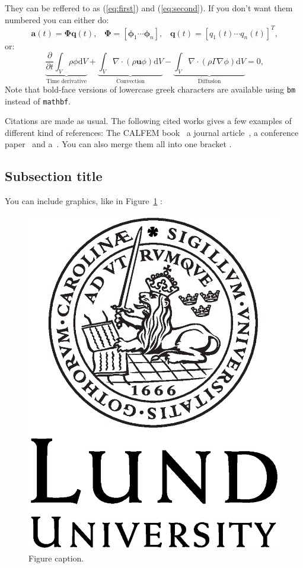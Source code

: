 They can be reffered to as (\ref{eq:first}) and (\ref{eq:second}). If you don't want them numbered you can either do:
\begin{equation*}
  \mathbf{a}(t) = \bm{\Phi}\mathbf{q}(t) \text{,} \quad
  \bm{\Phi} = \left[ \bm{\phi}_1 \dotsb \bm{\phi}_n  \right] \text{,} \quad
  \mathbf{q}(t) =  \left[ q_1(t) \dotsb q_n(t)  \right]^{T} \! \text{,}
\end{equation*}
or:
\[  \underbrace{\frac{\partial}{\partial t} \int_V \rho \phi \text{d}V}_\text{Time derivative} + \underbrace{\int_V \nabla \cdot (\rho \mathbf{u} \phi) \text{d}V}_\text{Convection} - \underbrace{\int_V \nabla \cdot (\rho \Gamma \nabla \phi) \text{d}V}_\text{Diffusion} = 0 \text{,}
\]
Note that bold-face versions of lowercase greek characters are available using \texttt{bm} instead of \texttt{mathbf}.

Citations are made as usual. The following cited works gives a few examples of different kind of references: The CALFEM book~\cite{CALFEM} a journal article~\cite{JournalArticle}, a conference paper~\cite{Conference} and a~\cite{Thesis}. You can also merge them all into one bracket \cite{CALFEM,JournalArticle,Conference,Thesis}. 


\subsection{Subsection title}
You can include graphics, like in Figure~\ref{fig:logo} :
\begin{figure}
  \includegraphics[scale=0.3]{LundUniversity_C2line_BLACK.eps}
  \caption{Figure caption.}
  \label{fig:logo}
\end{figure}

